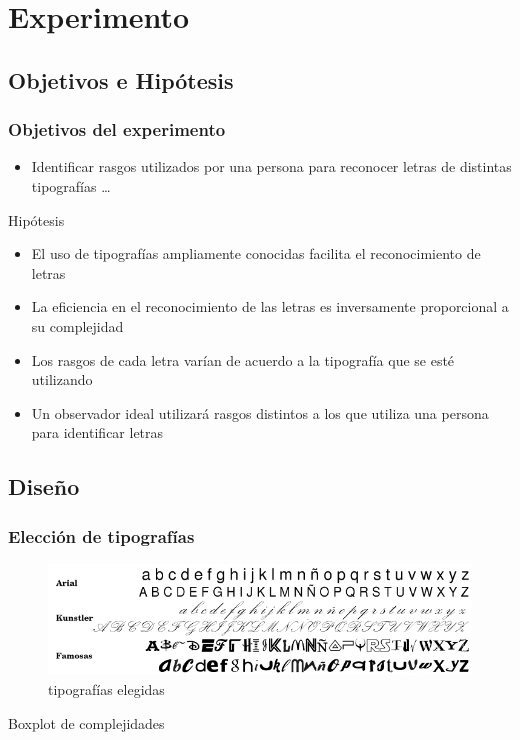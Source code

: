 \documentclass{beamer}
\begin{document}
\section{Experimento}
 
  \subsection{Objetivos e Hip\'otesis}
      \begin{frame}
	\frametitle{Objetivos del experimento}
	\begin{itemize}
		\item Identificar rasgos utilizados por una persona para reconocer letras de distintas tipograf\'ias  \ldots 
      \end{itemize}

      \begin{block}{Hip\'otesis}
      \begin{itemize}
		\item El uso de tipograf\'ias ampliamente conocidas facilita el reconocimiento de letras 
		\item La eficiencia en el reconocimiento de las letras es inversamente proporcional a su complejidad 
		\item Los rasgos de cada letra var\'ian de acuerdo a la tipograf\'ia que se est\'e utilizando 
		\item Un observador ideal utilizar\'a rasgos distintos a los que utiliza una persona para identificar letras	
	  \end{itemize}
      \end{block}

      \end{frame}

 \subsection{Dise\~no}

	\begin{frame}
	\frametitle{Elecci\'on de tipograf\'ias}
	\begin{figure}
	\includegraphics[width=\textwidth]{graficos/letras.png}
	\caption{tipograf\'ias elegidas}
	\end{figure}
	Boxplot de complejidades
	\end{frame}
\end{document}
